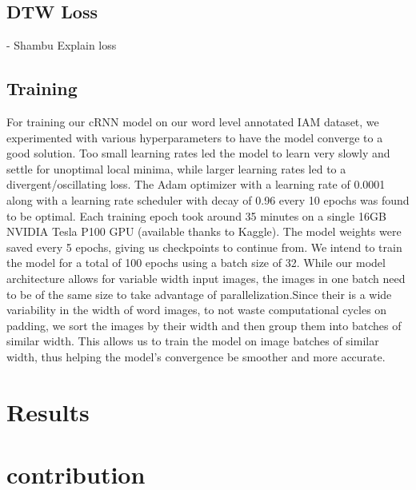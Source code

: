 \documentclass[10pt,twocolumn,letterpaper]{article}
\begin{document}
\subsection{DTW Loss} - Shambu
Explain loss 

\subsection{Training}
For training our cRNN model on our word level annotated IAM dataset, we experimented with various hyperparameters to have the model converge to a good solution. Too small learning rates led the model to learn very slowly and settle for unoptimal local minima, while larger learning rates led to a divergent/oscillating loss. The Adam optimizer with a learning rate of 0.0001 along with a learning rate scheduler with decay of 0.96 every 10 epochs was found to be optimal. Each training epoch took around 35 minutes on a single 16GB NVIDIA Tesla P100 GPU (available thanks to Kaggle). The model weights were saved every 5 epochs, giving us checkpoints to continue from. We intend to train the model for a total of 100 epochs using a batch size of 32. While our model architecture allows for variable width input images, the images in one batch need to be of the same size to take advantage of parallelization.Since their is a wide variability in the width of word images, to not waste computational cycles on padding, we sort the images by their width and then group them into batches of similar width. This allows us to train the model on image batches of similar width, thus helping the model's convergence be smoother and more accurate.

\section{Results}

\section{contribution}

{\small


}
\end{document}
